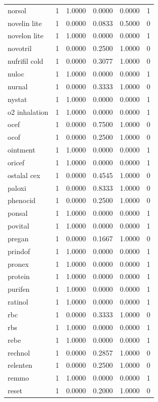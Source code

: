 \begin{longtable}{p{3.0cm}rrrrr}
norsol & 1 & 1.0000 & 0.0000 & 0.0000 & 1 \\
novelin lite & 1 & 0.0000 & 0.0833 & 0.5000 & 0 \\
novelon lite & 1 & 1.0000 & 0.0000 & 0.0000 & 1 \\
novotril & 1 & 0.0000 & 0.2500 & 1.0000 & 0 \\
nufrifil cold & 1 & 0.0000 & 0.3077 & 1.0000 & 0 \\
nuloc & 1 & 1.0000 & 0.0000 & 0.0000 & 1 \\
nurnal & 1 & 0.0000 & 0.3333 & 1.0000 & 0 \\
nystat & 1 & 1.0000 & 0.0000 & 0.0000 & 1 \\
o2 inhalation & 1 & 1.0000 & 0.0000 & 0.0000 & 1 \\
ocef & 1 & 0.0000 & 0.7500 & 1.0000 & 0 \\
ocof & 1 & 0.0000 & 0.2500 & 1.0000 & 0 \\
ointment & 1 & 1.0000 & 0.0000 & 0.0000 & 1 \\
oricef & 1 & 1.0000 & 0.0000 & 0.0000 & 1 \\
ostalal cex & 1 & 0.0000 & 0.4545 & 1.0000 & 0 \\
paloxi & 1 & 0.0000 & 0.8333 & 1.0000 & 0 \\
phenocid & 1 & 0.0000 & 0.2500 & 1.0000 & 0 \\
ponsal & 1 & 1.0000 & 0.0000 & 0.0000 & 1 \\
povital & 1 & 1.0000 & 0.0000 & 0.0000 & 1 \\
pregan & 1 & 0.0000 & 0.1667 & 1.0000 & 0 \\
prindof & 1 & 1.0000 & 0.0000 & 0.0000 & 1 \\
pronex & 1 & 1.0000 & 0.0000 & 0.0000 & 1 \\
protein & 1 & 1.0000 & 0.0000 & 0.0000 & 1 \\
purifen & 1 & 1.0000 & 0.0000 & 0.0000 & 1 \\
ratinol & 1 & 1.0000 & 0.0000 & 0.0000 & 1 \\
rbc & 1 & 0.0000 & 0.3333 & 1.0000 & 0 \\
rbs & 1 & 1.0000 & 0.0000 & 0.0000 & 1 \\
rebe & 1 & 1.0000 & 0.0000 & 0.0000 & 1 \\
rechnol & 1 & 0.0000 & 0.2857 & 1.0000 & 0 \\
relenten & 1 & 0.0000 & 0.2500 & 1.0000 & 0 \\
remmo & 1 & 1.0000 & 0.0000 & 0.0000 & 1 \\
reset & 1 & 0.0000 & 0.2000 & 1.0000 & 0 \\

\end{longtable}
